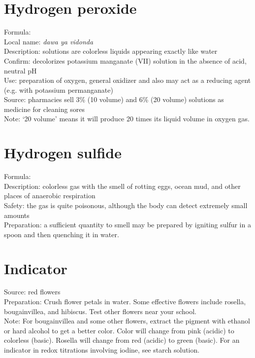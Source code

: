 \section{Hydrogen peroxide}
\label{sec:}
Formula: \\
Local name: \textit{dawa ya vidonda}\\
Description: solutions are colorless liquids 
appearing exactly like water\\
Confirm: decolorizes potassium manganate (VII) solution 
in the absence of acid, 
neutral pH\\
Use: preparation of oxygen, 
general oxidizer and also may act as a reducing agent (e.g. 
with potassium permanganate)\\
Source: pharmacies sell 3\% (10 volume) and 6\% (20 volume) solutions 
as medicine for cleaning sores\\
Note: `20 volume' means it will produce 20 times its liquid volume in oxygen gas.

\section{Hydrogen sulfide}
\label{sec:}
Formula: \\
Description: colorless gas with the smell of rotting eggs, 
ocean mud, 
and other places of anaerobic respiration\\
Safety: the gas is quite poisonous, 
although the body can detect extremely small amounts\\
Preparation: a sufficient quantity to smell 
may be prepared by igniting sulfur in a spoon 
and then quenching it in water.

\section{Indicator}
\label{sec:indicator}
Source: red flowers\\
Preparation: Crush flower petals in water. 
Some effective flowers include rosella, 
bougainvillea, 
and hibiscus. 
Test other flowers near your school.\\
Note: For bougainvillea and some other flowers, 
extract the pigment with ethanol 
or hard alcohol to get a better color. 
Color will change from pink (acidic) to colorless (basic). 
Rosella will change from red (acidic) to green (basic).
For an indicator in redox titrations involving iodine, 
see starch solution.

